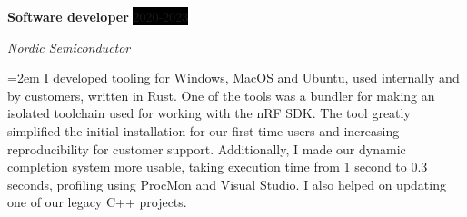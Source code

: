 \documentclass[paper=a4,fontsize=11pt,norsk]{scrartcl} %
\newcommand{\EducationEntry}[4]{
		\noindent \textbf{#1} \hfill      %
		\colorbox{Black}{%
			\parbox{6em}{%
			\hfill\color{White}#2}} \par  %
		\noindent \textit{#3} \par        %
		\noindent\hangindent=2em\hangafter=0 \small #4 %
		\normalsize \par}
\newcommand{\WorkEntry}[4]{				  %
		\noindent \textbf{#1} \hfill      %
		\colorbox{Black}{\color{White}#2} \par  %
		\noindent \textit{#3} \par              %
		\noindent\hangindent=2em\hangafter=0 \small #4 %
		\normalsize \par}
\begin{document}
\WorkEntry{Software developer}{2020-2023}{Nordic Semiconductor}{
I developed tooling for Windows, MacOS and Ubuntu, used internally and by customers, written in Rust.
One of the tools was a bundler for making an isolated toolchain used for working with the nRF SDK. The tool greatly simplified the initial installation for our first-time users and increasing reproducibility for customer support.
Additionally, I made our dynamic completion system more usable, taking execution time from 1 second to 0.3 seconds, profiling using ProcMon and Visual Studio.
I also helped on updating one of our legacy C++ projects.
}




\end{document}
